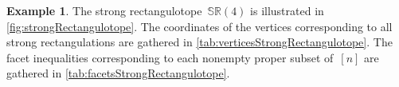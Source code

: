 \documentclass{amsart}
\theoremstyle{definition}
\newtheorem{example}[theorem]{Example}
\newcommand{\polytope}[1]{\mathds{#1}} %
\newcommand{\SRP}{\polytope{SR}} %
\begin{document}
\begin{example}
The strong rectangulotope~$\SRP(4)$ is illustrated in \cref{fig:strongRectangulotope}.
The coordinates of the vertices corresponding to all strong rectangulations are gathered in \cref{tab:verticesStrongRectangulotope}.
The facet inequalities corresponding to each nonempty proper subset of~$[n]$ are gathered in \cref{tab:facetsStrongRectangulotope}.



\end{example}
\end{document}
